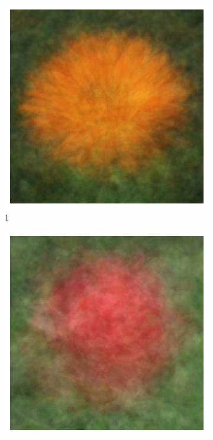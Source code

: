 \documentclass{article}
\begin{document}
\begin{figure}
\begin{subfigure}[b]{0.09\textwidth}
		\includegraphics[width= \textwidth]{ave1}
		\caption{1}
	\end{subfigure}
	\begin{subfigure}[b]{0.09\textwidth}
		\includegraphics[width= \textwidth]{ave2}

\end{subfigure}
\end{figure}
\end{document}
